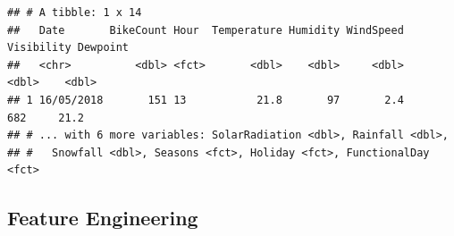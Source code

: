 \documentclass[
]{article}
\newenvironment{Shaded}{\begin{snugshade}}{\end{snugshade}}
\newcommand{\CommentTok}[1]{\textcolor[rgb]{0.56,0.35,0.01}{\textit{#1}}}
\newcommand{\FunctionTok}[1]{\textcolor[rgb]{0.00,0.00,0.00}{#1}}
\newcommand{\NormalTok}[1]{#1}
\newcommand{\SpecialCharTok}[1]{\textcolor[rgb]{0.00,0.00,0.00}{#1}}
\begin{document}
\begin{Shaded}
\end{Shaded}

\begin{verbatim}
## # A tibble: 1 x 14
##   Date       BikeCount Hour  Temperature Humidity WindSpeed Visibility Dewpoint
##   <chr>          <dbl> <fct>       <dbl>    <dbl>     <dbl>      <dbl>    <dbl>
## 1 16/05/2018       151 13           21.8       97       2.4        682     21.2
## # ... with 6 more variables: SolarRadiation <dbl>, Rainfall <dbl>,
## #   Snowfall <dbl>, Seasons <fct>, Holiday <fct>, FunctionalDay <fct>
\end{verbatim}

\hypertarget{feature-engineering}{%
\subsection{Feature Engineering}\label{feature-engineering}}
\end{document}
